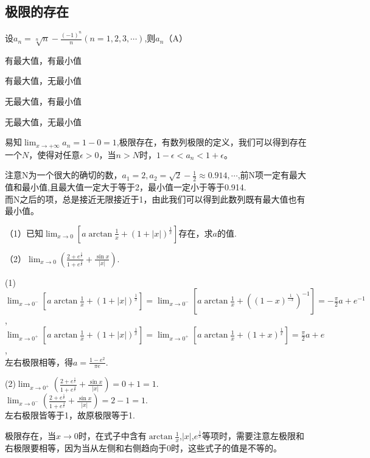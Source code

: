 \subsection{极限的存在}

\begin{example}
	设$a_n=\sqrt[n]{n}-\frac{(-1)^n}{n}(n=1,2,3,\cdots)$,则$a_n$（A）\xparen
	\begin{xchoices}[showanswer=true]
		\item* 有最大值，有最小值
		\item 有最大值，无最小值
		\item 无最大值，有最小值
		\item 无最大值，无最小值
	\end{xchoices}
	\vspace{0.3em}
	\begin{solution}
		易知$\lim_{x \to +\infty}a_n=1-0=1$,极限存在，有数列极限的定义，我们可以得到存在一个$N$，使得对任意$\epsilon>0$，当$n>N$时，$1-\epsilon<a_n<1+\epsilon$。

		注意N为一个很大的确切的数，$a_1=2,a_2=\sqrt{2}-\frac{1}{2}\approx 0.914,\cdots $,前N项一定有最大值和最小值,且最大值一定大于等于2，最小值一定小于等于0.914.\\而N之后的项，总是接近无限接近于1，由此我们可以得到此数列既有最大值也有最小值。
	\end{solution}
\end{example}

\begin{example}
	（1）已知$\lim_{x \to 0}[a\arctan\frac{1}{x}+(1+|x|)^{\frac{1}{x}}]$存在，求$a$的值.

	（2）$\lim_{x \to 0}(\frac{2+e^{\frac{1}{x}}}{1+e^{\frac{4}{x}}}+\frac{\sin x}{|x|})$.
\end{example}
\begin{solution}
	(1)$\lim_{x \to 0^-}[a\arctan\frac{1}{x}+(1+|x|)^{\frac{1}{x}}]=\lim_{x \to 0^-}[a\arctan\frac{1}{x}+((1-x)^{\frac{1}{-x}})^{-1}]=-\frac{\pi}{2}a+e^{-1}$,\\
	$\lim_{x \to 0^+}[a\arctan\frac{1}{x}+(1+|x|)^{\frac{1}{x}}]=\lim_{x \to 0^+}[a\arctan\frac{1}{x}+(1+x)^{\frac{1}{x}}]=\frac{\pi}{2}a+e$,\\
	左右极限相等，得$a=\frac{1-e^2}{\pi e}$.

	(2)$\lim_{x \to 0^+}(\frac{2+e^{\frac{1}{x}}}{1+e^{\frac{4}{x}}}+\frac{\sin x}{|x|})=0+1=1$.\\
	$\lim_{x \to 0^-}(\frac{2+e^{\frac{1}{x}}}{1+e^{\frac{4}{x}}}+\frac{\sin x}{|x|})=2-1=1$.\\
	左右极限皆等于1，故原极限等于1.
\end{solution}
\begin{remark}
	极限存在，当$x \to 0$时，在式子中含有$\arctan\frac{1}{x}$,$|x|$,$e^{\frac{1}{x}}$等项时，需要注意左极限和右极限要相等，因为当从左侧和右侧趋向于0时，这些式子的值是不等的。
\end{remark}

